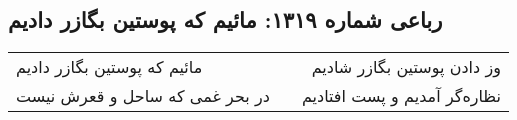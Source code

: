 \begin{center}
\section*{رباعی شماره ۱۳۱۹: مائیم که پوستین بگازر دادیم}
\label{sec:1319}
\begin{longtable}{l p{0.5cm} r}
مائیم که پوستین بگازر دادیم
&&
وز دادن پوستین بگازر شادیم
\\
در بحر غمی که ساحل و قعرش نیست
&&
نظاره‌گر آمدیم و پست افتادیم
\\
\end{longtable}
\end{center}
